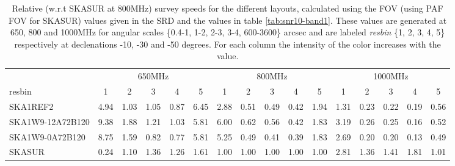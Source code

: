 \begin{table}[!htp]
{{\begin{tabular}{|lccccc||ccccc||ccccc|}
 \tabularnewline \cline{2-16} \multicolumn{1}{c}{ } & \multicolumn{5}{|c}{650MHz}  & \multicolumn{5}{c}{800MHz}  & \multicolumn{5}{c|}{1000MHz} \tabularnewline \cline{1-16} 
 resbin  &1 & 2 & 3 & 4 & 5 & 1 & 2 & 3 & 4 & 5 & 1 & 2 & 3 & 4 & 5 \tabularnewline \hline
SKA1REF2 & 4.94 \cellcolor{blue!39.59} & 1.03 \cellcolor{red!18.00} & 1.05 \cellcolor{green!36.00} & 0.87 \cellcolor{orange!26.40} & 6.45 \cellcolor{purple!60.00} & 2.88 \cellcolor{blue!33.75} & 0.51 \cellcolor{red!19.20} & 0.49 \cellcolor{green!23.48} & 0.42 \cellcolor{orange!20.21} & 1.94 \cellcolor{purple!60.00} & 1.31 \cellcolor{blue!18.00} & 0.23 \cellcolor{red!19.05} & 0.22 \cellcolor{green!18.80} & 0.19 \cellcolor{orange!19.62} & 0.56 \cellcolor{purple!23.25}\\ \hline 
SKA1W9-12A72B120 & 9.38 \cellcolor{blue!60.00} & 1.88 \cellcolor{red!60.00} & 1.21 \cellcolor{green!48.00} & 1.03 \cellcolor{orange!40.40} & 5.81 \cellcolor{purple!54.40} & 6.00 \cellcolor{blue!60.00} & 0.62 \cellcolor{red!28.80} & 0.56 \cellcolor{green!28.96} & 0.42 \cellcolor{orange!20.21} & 1.83 \cellcolor{purple!55.17} & 3.19 \cellcolor{blue!60.00} & 0.26 \cellcolor{red!20.10} & 0.25 \cellcolor{green!19.69} & 0.16 \cellcolor{orange!18.81} & 0.52 \cellcolor{purple!19.75}\\ \hline 
SKA1W9-0A72B120 & 8.75 \cellcolor{blue!57.13} & 1.59 \cellcolor{red!45.76} & 0.82 \cellcolor{green!18.00} & 0.77 \cellcolor{orange!18.00} & 5.81 \cellcolor{purple!54.40} & 5.25 \cellcolor{blue!53.70} & 0.49 \cellcolor{red!18.00} & 0.41 \cellcolor{green!18.00} & 0.39 \cellcolor{orange!18.00} & 1.83 \cellcolor{purple!55.17} & 2.69 \cellcolor{blue!48.80} & 0.20 \cellcolor{red!18.00} & 0.20 \cellcolor{green!18.00} & 0.13 \cellcolor{orange!18.00} & 0.49 \cellcolor{purple!18.00}\\ \hline 
SKASUR & 0.24 \cellcolor{blue!18.00} & 1.10 \cellcolor{red!21.56} & 1.36 \cellcolor{green!60.00} & 1.26 \cellcolor{orange!60.00} & 1.61 \cellcolor{purple!18.00} & 1.00 \cellcolor{blue!18.00} & 1.00 \cellcolor{red!60.00} & 1.00 \cellcolor{green!60.00} & 1.00 \cellcolor{orange!60.00} & 1.00 \cellcolor{purple!18.00} & 2.81 \cellcolor{blue!51.60} & 1.36 \cellcolor{red!60.00} & 1.41 \cellcolor{green!60.00} & 1.81 \cellcolor{orange!60.00} & 1.01 \cellcolor{purple!60.00}\tabularnewline \hline 
\end{tabular}}\hfil 

\caption{Relative (w.r.t SKASUR at 800MHz) survey speeds for the different layouts, calculated using the FOV (using PAF FOV for SKASUR) values given in the SRD \cite{srd} and the values in table \ref{tab:snr10-band1}. These values are generated at 650, 800 and 1000MHz for angular scales \{0.4-1, 1-2, 2-3, 3-4, 600-3600\} arcsec and are labeled {\it resbin} \{1, 2, 3, 4, 5\} respectively at declenations -10, -30 and -50 degrees. For each column the intensity of the color increases with the value.}\label{tab:speed-band1}}
 \end{table}
